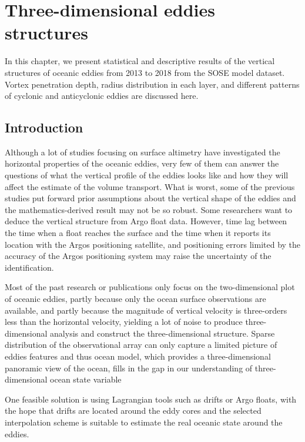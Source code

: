 \chapter{Three-dimensional eddies structures}\label{Three-dimensional eddies structures}

In this chapter, we present statistical and descriptive results of the vertical structures of oceanic eddies from 2013 to 2018 from the SOSE model dataset. Vortex penetration depth, radius distribution in each layer, and different patterns of cyclonic and anticyclonic eddies are discussed here.

\section{Introduction}

Although a lot of studies focusing on surface altimetry have investigated the horizontal properties of the oceanic eddies, very few of them can answer the questions of what the vertical profile of the eddies looks like and how they will affect the estimate of the volume transport. What is worst, some of the previous studies put forward prior assumptions about the vertical shape of the eddies and the mathematics-derived result may not be so robust. Some researchers want to deduce the vertical structure from Argo float data. However, time lag between the time when a float reaches the surface and the time when it reports its location with the Argos positioning satellite, and positioning errors limited by the accuracy of the Argos positioning system may raise the uncertainty of the identification\cite{chaigneau2011vertical}.

Most of the past research or publications only focus on the two-dimensional plot of oceanic eddies, partly because only the ocean surface observations are available, and partly because the magnitude of vertical velocity is three-orders less than the horizontal velocity, yielding a lot of noise to produce three-dimensional analysis and construct the three-dimensional structure. Sparse distribution of the observational array can only capture a limited picture of eddies features and thus ocean model, which provides a three-dimensional panoramic view of the ocean, fills in the gap in our understanding of three-dimensional ocean state variable 

One feasible solution is using Lagrangian tools such as drifts or Argo floats, with the hope that drifts are located around the eddy cores and the selected interpolation scheme is suitable to estimate the real oceanic state around the eddies.

